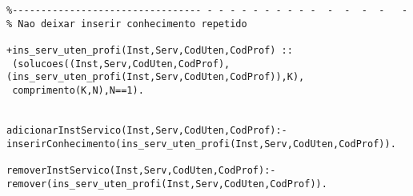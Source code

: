 \documentclass[pdftex,12pt,a4paper]{report}
\begin{document}
\begin{appendices}
\begin{Verbatim}
%--------------------------------- - - - - - - - - - -  -  -  -  -   -
% Nao deixar inserir conhecimento repetido

+ins_serv_uten_profi(Inst,Serv,CodUten,CodProf) ::
 (solucoes((Inst,Serv,CodUten,CodProf),
(ins_serv_uten_profi(Inst,Serv,CodUten,CodProf)),K),
 comprimento(K,N),N==1).


adicionarInstServico(Inst,Serv,CodUten,CodProf):- 
inserirConhecimento(ins_serv_uten_profi(Inst,Serv,CodUten,CodProf)).

removerInstServico(Inst,Serv,CodUten,CodProf):- 
remover(ins_serv_uten_profi(Inst,Serv,CodUten,CodProf)).


\end{Verbatim}

\end{appendices}
\end{document}
